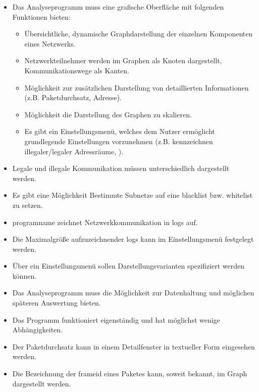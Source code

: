 \begin{itemize}
\item Das Analyseprogramm muss eine grafische Oberfläche mit folgenden Funktionen bieten:

	\begin{itemize}
    \item Übersichtliche, dynamische Graphdarstellung der einzelnen Komponenten eines Netzwerks.
    
    \item Netzwerkteilnehmer werden im Graphen als Knoten dargestellt, Kommunikationswege als Kanten.

    \item Möglichkeit zur zusätzlichen Darstellung von detaillierten Informationen (z.B. Paketdurchsatz, Adresse).

    \item Möglichkeit die Darstellung des Graphen zu skalieren.

    \item Es gibt ein Einstellungsmenü, welches dem Nutzer ermöglicht grundlegende Einstellungen vorzunehmen (z.B. kennzeichnen illegaler/legaler Adressräume, ).
    \end{itemize}

\item Legale und illegale Kommunikation müssen unterschiedlich dargestellt werden.

\item Es gibt eine Möglichkeit Bestimmte Subnetze auf eine \gls{blacklist} bzw. \gls{whitelist} zu setzen.

\item \gls{programname} zeichnet Netzwerkkommunikation in \glspl{log} auf.

\item Die Maximalgröße aufzuzeichnender \glspl{log} kann im Einstellungsmenü festgelegt werden.

\item Über ein Einstellungsmenü sollen Darstellungsvarianten spezifiziert werden können.

\item Das Analyseprogramm muss die Möglichkeit zur Datenhaltung und möglichen späteren Auswertung bieten.

\item Das Programm funktioniert eigenständig und hat möglichst wenige Abhängigkeiten.

\item Der Paketdurchsatz kann in einem Detailfenster in textueller Form eingesehen werden.

\item Die Bezeichnung der \gls{frameid} eines Paketes kann, soweit bekannt, im Graph dargestellt werden.

\end{itemize}

